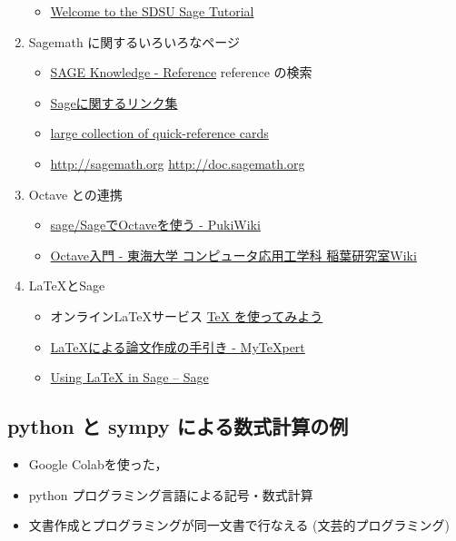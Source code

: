 \documentclass[dvipdfmx,11pat]{jarticle}
\begin{document}
\begin{enumerate}
\begin{itemize}
\item \href{http://mosullivan.sdsu.edu/Teaching/sdsu-sage-tutorial/index.html}{Welcome to the SDSU Sage Tutorial}
\end{itemize}
\item Sagemath に関するいろいろなページ
\label{sec:org4b42fdd}
\begin{itemize}
\item \href{http://sk.sagepub.com/reference}{SAGE Knowledge - Reference} reference の検索
\item \href{https://qiita.com/HirofumiYashima/items/6bb5770961a3b7d33118}{Sageに関するリンク集}
\item \href{http://wiki.sagemath.org/quickref}{large collection of quick-reference cards}
\item \url{http://sagemath.org} \url{http://doc.sagemath.org}
\end{itemize}
\item Octave との連携
\label{sec:orgd053694}
\begin{itemize}
\item \href{http://www.pwv.co.jp/\%7Etake/TakeWiki/index.php?sage\%2FSage\%E3\%81\%A7Octave\%E3\%82\%92\%E4\%BD\%BF\%E3\%81\%86}{sage/SageでOctaveを使う - PukiWiki}
\item \href{http://www.inaba-lab.org/wiki/index.php/Octave\%E5\%85\%A5\%E9\%96\%80}{Octave入門 - 東海大学 コンピュータ応用工学科 稲葉研究室Wiki}
\end{itemize}
\item \LaTeX{}とSage
\label{sec:orgae43b3f}
\begin{itemize}
\item オンライン\LaTeX{}サービス  \href{https://oku.edu.mie-u.ac.jp/\~okumura/texonweb/}{\TeX{} を使ってみよう}
\item \href{https://mytexpert.osdn.jp/index.php?LaTeX\%A4\%CB\%A4\%E8\%A4\%EB\%CF\%C0\%CA\%B8\%BA\%EE\%C0\%AE\%A4\%CE\%BC\%EA\%B0\%FA\%A4\%AD}{\LaTeX{}による論文作成の手引き - MyTeXpert}
\item \href{http://sage.math.gordon.edu/home/pub/51/}{Using \LaTeX{} in Sage -- Sage}
\end{itemize}
\end{enumerate}
\subsection{python と sympy による数式計算の例}
\label{sec:org47897eb}



\begin{itemize}
\item Google Colabを使った，
\item python プログラミング言語による記号・数式計算
\item 文書作成とプログラミングが同一文書で行なえる (文芸的プログラミング)
\end{itemize}
\end{document}
